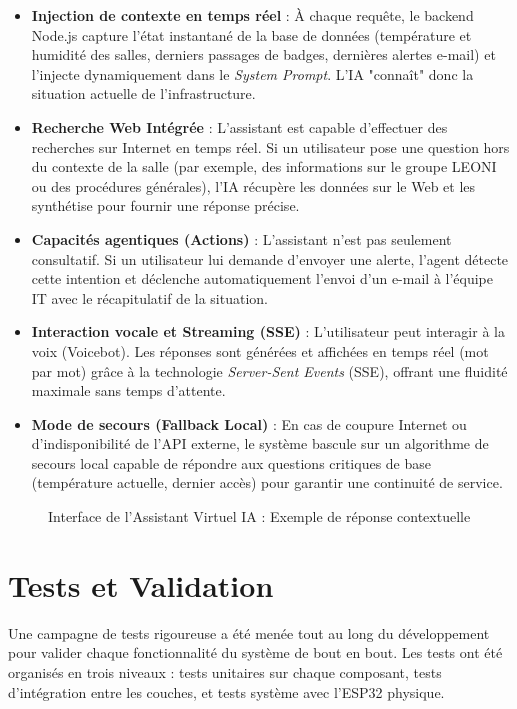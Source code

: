 \documentclass[12pt,a4paper]{report}
\begin{document}
\begin{itemize}
    \item \textbf{Injection de contexte en temps réel} : À chaque requête, le backend Node.js capture l'état instantané de la base de données (température et humidité des salles, derniers passages de badges, dernières alertes e-mail) et l'injecte dynamiquement dans le \textit{System Prompt}. L'IA "connaît" donc la situation actuelle de l'infrastructure.
    \item \textbf{Recherche Web Intégrée} : L'assistant est capable d'effectuer des recherches sur Internet en temps réel. Si un utilisateur pose une question hors du contexte de la salle (par exemple, des informations sur le groupe LEONI ou des procédures générales), l'IA récupère les données sur le Web et les synthétise pour fournir une réponse précise.
    \item \textbf{Capacités agentiques (Actions)} : L'assistant n'est pas seulement consultatif. Si un utilisateur lui demande d'envoyer une alerte, l'agent détecte cette intention et déclenche automatiquement l'envoi d'un e-mail à l'équipe IT avec le récapitulatif de la situation.
    \item \textbf{Interaction vocale et Streaming (SSE)} : L'utilisateur peut interagir à la voix (Voicebot). Les réponses sont générées et affichées en temps réel (mot par mot) grâce à la technologie \textit{Server-Sent Events} (SSE), offrant une fluidité maximale sans temps d'attente.
    \item \textbf{Mode de secours (Fallback Local)} : En cas de coupure Internet ou d'indisponibilité de l'API externe, le système bascule sur un algorithme de secours local capable de répondre aux questions critiques de base (température actuelle, dernier accès) pour garantir une continuité de service.
\end{itemize}

\begin{figure}[h]
    \centering
    \caption{Interface de l'Assistant Virtuel IA : Exemple de réponse contextuelle}
\end{figure}

\section{Tests et Validation}
Une campagne de tests rigoureuse a été menée tout au long du développement pour valider chaque fonctionnalité du système de bout en bout. Les tests ont été organisés en trois niveaux : tests unitaires sur chaque composant, tests d'intégration entre les couches, et tests système avec l'ESP32 physique.
\end{document}
